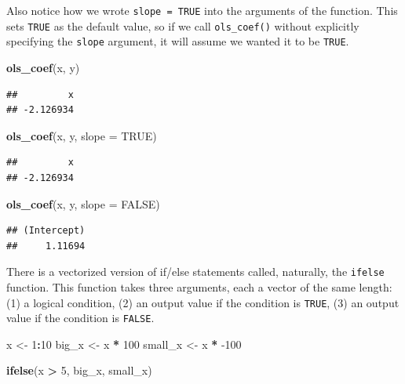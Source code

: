 \documentclass[
  12pt,
  oneside,openany]{book}
\newenvironment{Shaded}{\begin{snugshade}}{\end{snugshade}}
\newcommand{\DataTypeTok}[1]{\textcolor[rgb]{0.13,0.29,0.53}{#1}}
\newcommand{\DecValTok}[1]{\textcolor[rgb]{0.00,0.00,0.81}{#1}}
\newcommand{\KeywordTok}[1]{\textcolor[rgb]{0.13,0.29,0.53}{\textbf{#1}}}
\newcommand{\NormalTok}[1]{#1}
\newcommand{\OperatorTok}[1]{\textcolor[rgb]{0.81,0.36,0.00}{\textbf{#1}}}
\newcommand{\OtherTok}[1]{\textcolor[rgb]{0.56,0.35,0.01}{#1}}
\newcommand{\StringTok}[1]{\textcolor[rgb]{0.31,0.60,0.02}{#1}}
\begin{document}
Also notice how we wrote \texttt{slope\ =\ TRUE} into the arguments of the function.
This sets \texttt{TRUE} as the default value, so if we call \texttt{ols\_coef()} without explicitly specifying the \texttt{slope} argument, it will assume we wanted it to be \texttt{TRUE}.

\begin{Shaded}
\begin{Highlighting}[]
\KeywordTok{ols\_coef}\NormalTok{(x, y)}
\end{Highlighting}
\end{Shaded}

\begin{verbatim}
##         x 
## -2.126934
\end{verbatim}

\begin{Shaded}
\begin{Highlighting}[]
\KeywordTok{ols\_coef}\NormalTok{(x, y, }\DataTypeTok{slope =} \OtherTok{TRUE}\NormalTok{)}
\end{Highlighting}
\end{Shaded}

\begin{verbatim}
##         x 
## -2.126934
\end{verbatim}

\begin{Shaded}
\begin{Highlighting}[]
\KeywordTok{ols\_coef}\NormalTok{(x, y, }\DataTypeTok{slope =} \OtherTok{FALSE}\NormalTok{)}
\end{Highlighting}
\end{Shaded}

\begin{verbatim}
## (Intercept) 
##     1.11694
\end{verbatim}

There is a vectorized version of if/else statements called, naturally, the \texttt{ifelse} function. This function takes three arguments, each a vector of the same length: (1) a logical condition, (2) an output value if the condition is \texttt{TRUE}, (3) an output value if the condition is \texttt{FALSE}.

\begin{Shaded}
\begin{Highlighting}[]
\NormalTok{x \textless{}{-}}\StringTok{ }\DecValTok{1}\OperatorTok{:}\DecValTok{10}
\NormalTok{big\_x \textless{}{-}}\StringTok{ }\NormalTok{x }\OperatorTok{*}\StringTok{ }\DecValTok{100}
\NormalTok{small\_x \textless{}{-}}\StringTok{ }\NormalTok{x }\OperatorTok{*}\StringTok{ }\DecValTok{{-}100}

\KeywordTok{ifelse}\NormalTok{(x }\OperatorTok{\textgreater{}}\StringTok{ }\DecValTok{5}\NormalTok{, big\_x, small\_x)}
\end{Highlighting}
\end{Shaded}
\end{document}
